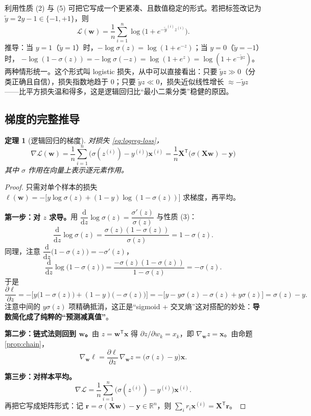 \documentclass[UTF8,a4paper,11pt]{ctexart}
\theoremstyle{definition}
\theoremstyle{plain}
\newtheorem{theorem}[definition]{定理}
\theoremstyle{remark}
\newcommand{\R}{\mathbb{R}}
\newcommand{\Loss}{\mathcal{L}}
\newcommand{\dd}{\mathrm{d}}
\newcommand{\T}{^{\mathsf{T}}}
\begin{document}
利用性质 (2) 与 (5) 可把它写成一个更紧凑、且数值稳定的形式。若把标签改记为 $\tilde y=2y-1\in\{-1,+1\}$，则
\begin{equation}\label{eq:logreg-softplus}
  \Loss(\bm{w})=\frac1n\sum_{i=1}^{n}\log\big(1+e^{-\tilde y^{(i)}z^{(i)}}\big).
\end{equation}
推导：当 $y=1$（$\tilde y=1$）时，$-\log\sigma(z)=\log(1+e^{-z})$；当 $y=0$（$\tilde y=-1$）时，
$-\log(1-\sigma(z))=-\log\sigma(-z)=\log(1+e^{z})=\log(1+e^{-\tilde y z})$。两种情形统一。这个形式叫 logistic 损失，从中可以直接看出：只要 $\tilde y z\gg0$（分类正确且自信），损失指数地趋于 $0$；只要 $\tilde yz\ll0$，损失近似线性增长 $\approx-\tilde yz$——比平方损失温和得多，这是逻辑回归比“最小二乘分类”稳健的原因。

\subsection{梯度的完整推导}

\begin{theorem}[逻辑回归的梯度]\label{thm:logreg-grad}
对损失 \eqref{eq:logreg-loss}，
\begin{equation}\label{eq:logreg-grad}
  \boxed{\ \nabla\Loss(\bm{w})=\frac1n\sum_{i=1}^{n}\big(\sigma(z^{(i)})-y^{(i)}\big)\bm{x}^{(i)}
  =\frac1n\bm{X}\T\big(\sigma(\bm{X}\bm{w})-\bm{y}\big)\ }
\end{equation}
其中 $\sigma$ 作用在向量上表示逐元素作用。
\end{theorem}

\begin{proof}
只需对单个样本的损失 $\ell(\bm{w})=-\big[y\log\sigma(z)+(1-y)\log(1-\sigma(z))\big]$ 求梯度，再平均。

\textbf{第一步：对 $z$ 求导。}用 $\dfrac{\dd}{\dd z}\log\sigma(z)=\dfrac{\sigma'(z)}{\sigma(z)}$ 与性质 (3)：
\[
  \frac{\dd}{\dd z}\log\sigma(z)=\frac{\sigma(z)(1-\sigma(z))}{\sigma(z)}=1-\sigma(z).
\]
同理，注意 $\dfrac{\dd}{\dd z}\big(1-\sigma(z)\big)=-\sigma'(z)$，
\[
  \frac{\dd}{\dd z}\log\big(1-\sigma(z)\big)=\frac{-\sigma(z)(1-\sigma(z))}{1-\sigma(z)}=-\sigma(z).
\]
于是
\[
  \frac{\partial\ell}{\partial z}
  =-\Big[y\big(1-\sigma(z)\big)+(1-y)\big(-\sigma(z)\big)\Big]
  =-\Big[y-y\sigma(z)-\sigma(z)+y\sigma(z)\Big]
  =\sigma(z)-y .
\]
注意中间的 $y\sigma(z)$ 项精确抵消，这正是“sigmoid + 交叉熵”这对搭配的妙处：\textbf{导数简化成了纯粹的“预测减真值”}。

\textbf{第二步：链式法则回到 $\bm{w}$。}由 $z=\bm{w}\T\bm{x}$ 得 $\partial z/\partial w_k=x_k$，即 $\nabla_{\bm{w}}z=\bm{x}$。由命题 \ref{prop:chain}，
\[
  \nabla_{\bm{w}}\ell=\frac{\partial\ell}{\partial z}\,\nabla_{\bm{w}}z=\big(\sigma(z)-y\big)\bm{x}.
\]

\textbf{第三步：对样本平均。}
\[
  \nabla\Loss=\frac1n\sum_{i=1}^n\big(\sigma(z^{(i)})-y^{(i)}\big)\bm{x}^{(i)} .
\]
再把它写成矩阵形式：记 $\bm{r}=\sigma(\bm{X}\bm{w})-\bm{y}\in\R^n$，则 $\sum_i r_i\bm{x}^{(i)}=\bm{X}\T\bm{r}$。
\end{proof}
\end{document}
